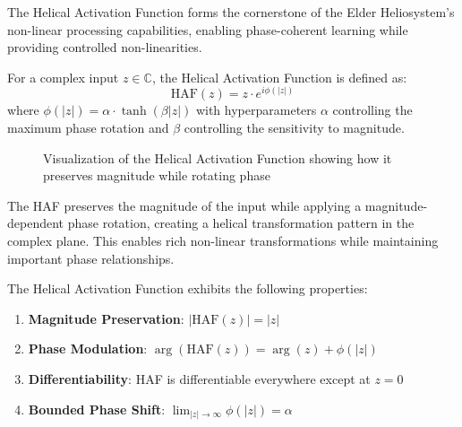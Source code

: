 The Helical Activation Function forms the cornerstone of the Elder Heliosystem's non-linear processing capabilities, enabling phase-coherent learning while providing controlled non-linearities.

\begin{definition}
For a complex input $z \in \mathbb{C}$, the Helical Activation Function is defined as:
\begin{equation}
\text{HAF}(z) = z \cdot e^{i\phi(|z|)}
\end{equation}
where $\phi(|z|) = \alpha \cdot \tanh(\beta|z|)$ with hyperparameters $\alpha$ controlling the maximum phase rotation and $\beta$ controlling the sensitivity to magnitude.
\end{definition}

\begin{figure}[h]
\centering
{}
\caption{Visualization of the Helical Activation Function showing how it preserves magnitude while rotating phase}
\end{figure}

The HAF preserves the magnitude of the input while applying a magnitude-dependent phase rotation, creating a helical transformation pattern in the complex plane. This enables rich non-linear transformations while maintaining important phase relationships.

\begin{theorem}
The Helical Activation Function exhibits the following properties:
\begin{enumerate}
    \item \textbf{Magnitude Preservation}: $|\text{HAF}(z)| = |z|$
    \item \textbf{Phase Modulation}: $\arg(\text{HAF}(z)) = \arg(z) + \phi(|z|)$
    \item \textbf{Differentiability}: HAF is differentiable everywhere except at $z=0$
    \item \textbf{Bounded Phase Shift}: $\lim_{|z| \to \infty} \phi(|z|) = \alpha$
\end{enumerate}
\end{theorem}

